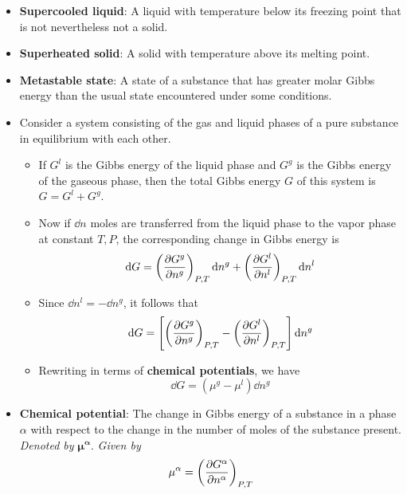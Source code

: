 \documentclass[../notes.tex]{subfiles}
\begin{document}
\begin{itemize}
\begin{itemize}
    \end{itemize}
    \item \textbf{Supercooled liquid}: A liquid with temperature below its freezing point that is not nevertheless not a solid.
    \item \textbf{Superheated solid}: A solid with temperature above its melting point.
    \item \textbf{Metastable state}: A state of a substance that has greater molar Gibbs energy than the usual state encountered under some conditions.
    \item Consider a system consisting of the gas and liquid phases of a pure substance in equilibrium with each other.
    \begin{itemize}
        \item If $G^l$ is the Gibbs energy of the liquid phase and $G^g$ is the Gibbs energy of the gaseous phase, then the total Gibbs energy $G$ of this system is $G=G^l+G^g$.
        \item Now if $\dd{n}$ moles are transferred from the liquid phase to the vapor phase at constant $T,P$, the corresponding change in Gibbs energy is
        \begin{equation*}
            \dd{G} = \left( \pdv{G^g}{n^g} \right)_{P,T}\dd{n^g}+\left( \pdv{G^l}{n^l} \right)_{P,T}\dd{n^l}
        \end{equation*}
        \item Since $\dd{n^l}=-\dd{n^g}$, it follows that
        \begin{equation*}
            \dd{G} = \left[ \left( \pdv{G^g}{n^g} \right)_{P,T}-\left( \pdv{G^l}{n^l} \right)_{P,T} \right]\dd{n^g}
        \end{equation*}
        \item Rewriting in terms of \textbf{chemical potentials}, we have
        \begin{equation*}
            \dd{G} = (\mu^g-\mu^l)\dd{n^g}
        \end{equation*}
    \end{itemize}
    \item \textbf{Chemical potential}: The change in Gibbs energy of a substance in a phase $\alpha$ with respect to the change in the number of moles of the substance present. \emph{Denoted by} $\bm{\mu^\alpha}$. \emph{Given by}
    \begin{equation*}
        \mu^\alpha = \left( \pdv{G^\alpha}{n^\alpha} \right)_{P,T}
    \end{equation*}
    \begin{itemize}

\end{itemize}
\end{itemize}
\end{document}
